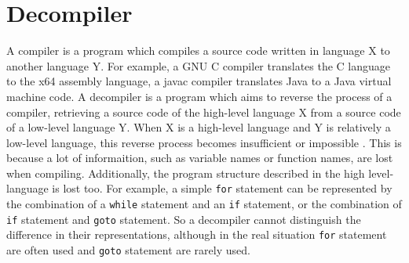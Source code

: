 \documentclass[senior,final,11pt]{iscs-thesis}
\begin{document}
\section{Decompiler}


A compiler is a program which compiles a source code written in language X to another language Y. 
For example, a GNU C compiler translates the C language to the x64 assembly language, a javac compiler translates Java to a Java virtual machine code.
A decompiler is a program which aims to reverse the process of a compiler, retrieving a source code of the high-level language X from a source code of a low-level language Y. 
When X is a high-level language and Y is relatively a low-level language, 
this reverse process becomes insufficient or impossible
\citep{hex_rays,decompile_hard_java}.
This is because a lot of informaition, such as variable names or function names, are lost when compiling.
Additionally, the program structure described in the high level-language is lost too. 
For example, a simple \texttt{for} statement can be represented by the combination of a \texttt{while} statement and an \texttt{if} statement, or the combination of \texttt{if} statement and \texttt{goto} statement. 
So a decompiler cannot distinguish the difference in their representations, 
although in the real situation \texttt{for} statement are often used and \texttt{goto} statement are rarely used.





\end{document}
